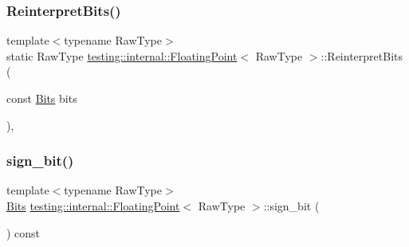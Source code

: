 \mbox{\label{classtesting_1_1internal_1_1_floating_point_ac551f793522e54fbd8a25acb79eac5b1}} 
\subsubsection{\texorpdfstring{ReinterpretBits()}{ReinterpretBits()}\hspace{0.1cm}{\footnotesize\ttfamily [3/3]}}
{\footnotesize\ttfamily template$<$typename Raw\+Type$>$ \\
static Raw\+Type \mbox{\hyperlink{classtesting_1_1internal_1_1_floating_point}{testing\+::internal\+::\+Floating\+Point}}$<$ Raw\+Type $>$\+::Reinterpret\+Bits (\begin{DoxyParamCaption}\item[{const \mbox{\hyperlink{classtesting_1_1internal_1_1_floating_point_abf228bf6cd48f12c8b44c85b4971a731}{Bits}}}]{bits }\end{DoxyParamCaption})\hspace{0.3cm}{\ttfamily [inline]}, {\ttfamily [static]}}

\mbox{\label{classtesting_1_1internal_1_1_floating_point_afb8a816bb598225d775caaf43a893ef0}} 
\subsubsection{\texorpdfstring{sign\_bit()}{sign\_bit()}\hspace{0.1cm}{\footnotesize\ttfamily [1/3]}}
{\footnotesize\ttfamily template$<$typename Raw\+Type$>$ \\
\mbox{\hyperlink{classtesting_1_1internal_1_1_floating_point_abf228bf6cd48f12c8b44c85b4971a731}{Bits}} \mbox{\hyperlink{classtesting_1_1internal_1_1_floating_point}{testing\+::internal\+::\+Floating\+Point}}$<$ Raw\+Type $>$\+::sign\+\_\+bit (\begin{DoxyParamCaption}{ }\end{DoxyParamCaption}) const\hspace{0.3cm}{\ttfamily [inline]}}

